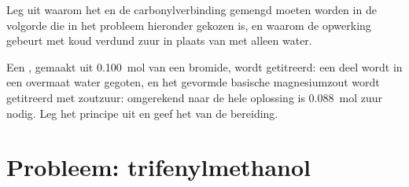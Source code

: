 \begin{exercise}[$\star\star\star$]\label{exo:b1:organomagnesium:11}
Leg uit waarom het  en de carbonylverbinding gemengd
moeten worden in de volgorde die in het probleem hieronder gekozen is, en
waarom de opwerking gebeurt met koud verdund zuur in plaats van met
alleen water.
\end{exercise}

\begin{exercise}[$\star\star\star$]\label{exo:b1:organomagnesium:12}
Een , gemaakt uit \qty{0.100}{mol} van een bromide, wordt
getitreerd: een deel wordt in een overmaat water gegoten, en het gevormde
basische magnesiumzout wordt getitreerd met zoutzuur: omgerekend naar de
hele oplossing is \qty{0.088}{mol} zuur nodig. Leg het principe uit en
geef het  van de bereiding.
\end{exercise}

\section{Probleem: trifenylmethanol}

